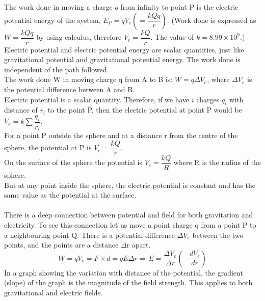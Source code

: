 \documentclass[a4paper,12pt]{article}
\begin{document}
The work done in moving a charge $q$ from infinity to point P is the electric potential energy of the system, $E_P=qV_e\left(=\dfrac{kQq}{r}\right)$. (Work done is expressed as $W=\dfrac{kQq}{r}$ by using calculus, therefore $V_e=\dfrac{kQ}{r}$. The value of $k=8.99\times 10^9$.)\\
Electric potential and electric potential energy are scalar quantities, just like gravitational potential and gravitational potential energy. The work done is independent of the path followed.\\
The work done W in moving charge q from A to B is: $W=q\Delta V_e$, where $\Delta V_e$ is the potential difference between A and B.\\
Electric potential is a scalar quantity. Therefore, if we have $i$ charges $q_i$ with distance of $r_i$ to the point P, then the electric potential at point P would be $V_e=\displaystyle k\sum \dfrac{q_i}{r_i}$.\\
For a point P outside the sphere and at a distance r from the centre of the sphere, the potential at P is $V_e=\dfrac{kQ}{r}$.\\
On the surface of the sphere the potential is $V_e=\dfrac{kQ}{R}$ where R is the radius of the sphere.\\
But at any point inside the sphere, the electric potential is constant and has the same value as the potential at the surface.\\\\
There is a deep connection between potential and field for both gravitation and electricity. To see this connection let us move a point charge q from a point P to a neighbouring point Q. There is a potential difference $\Delta V_e$ between the two points, and the points are a distance $\Delta$r apart.\\
$$W=qV_e=F\times d=qE\Delta r \Rightarrow E=\dfrac{\Delta V_e}{\Delta r}\left(-\dfrac{dV_e}{dr}\right)$$
In a graph showing the variation with distance of the potential, the gradient (slope) of the graph is the magnitude of the field strength. This applies to both gravitational and electric fields.
\end{document}
